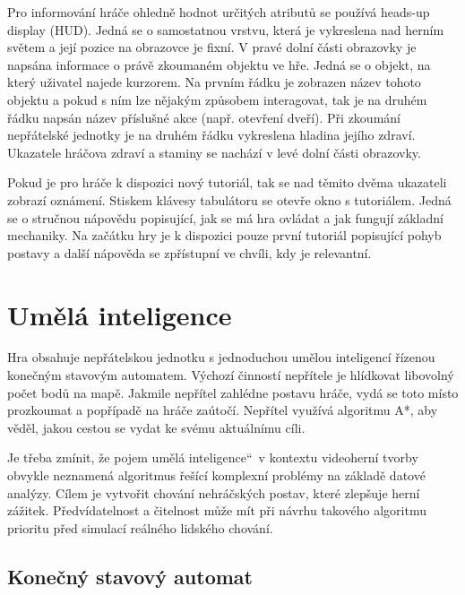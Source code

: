 \documentclass[FM,Proj]{tulthesis}
\begin{document}
	Pro informování hráče ohledně hodnot určitých atributů se používá heads-up display (HUD). Jedná se o samostatnou vrstvu, která je vykreslena nad herním světem a její pozice na obrazovce je fixní. V pravé dolní části obrazovky je napsána informace o právě zkoumaném objektu ve hře. Jedná se o objekt, na který uživatel najede kurzorem. Na prvním řádku je zobrazen název tohoto objektu a pokud s ním lze nějakým způsobem interagovat, tak je na druhém řádku napsán název příslušné akce (např. otevření dveří). Při zkoumání nepřátelské jednotky je na druhém řádku vykreslena hladina jejího zdraví. Ukazatele hráčova zdraví a staminy se nachází v levé dolní části obrazovky.
	
	Pokud je pro hráče k dispozici nový tutoriál, tak se nad těmito dvěma ukazateli zobrazí oznámení. Stiskem klávesy tabulátoru se otevře okno s tutoriálem. Jedná se o stručnou nápovědu popisující, jak se má hra ovládat a jak fungují základní mechaniky. Na začátku hry je k dispozici pouze první tutoriál popisující pohyb postavy a další nápověda se zpřístupní ve chvíli, kdy je relevantní.
	
	\section{Umělá inteligence}	
	
	Hra obsahuje nepřátelskou jednotku s jednoduchou umělou inteligencí řízenou konečným stavovým automatem. Výchozí činností nepřítele je hlídkovat libovolný počet bodů na mapě. Jakmile nepřítel zahlédne postavu hráče, vydá se toto místo prozkoumat a popřípadě na hráče zaútočí. Nepřítel využívá algoritmu A*, aby věděl, jakou cestou se vydat ke svému aktuálnímu cíli.
	
	Je třeba zmínit, že pojem \quotedblbase umělá inteligence\textquotedblleft\ v kontextu videoherní tvorby obvykle neznamená algoritmus řešící komplexní problémy na základě datové analýzy. Cílem je vytvořit chování nehráčských postav, které zlepšuje herní zážitek. Předvídatelnost a čitelnost může mít při návrhu takového algoritmu prioritu před simulací reálného lidského chování.
	\cite{gameAI}
	
	\subsection{Konečný stavový automat}
	
\end{document}
